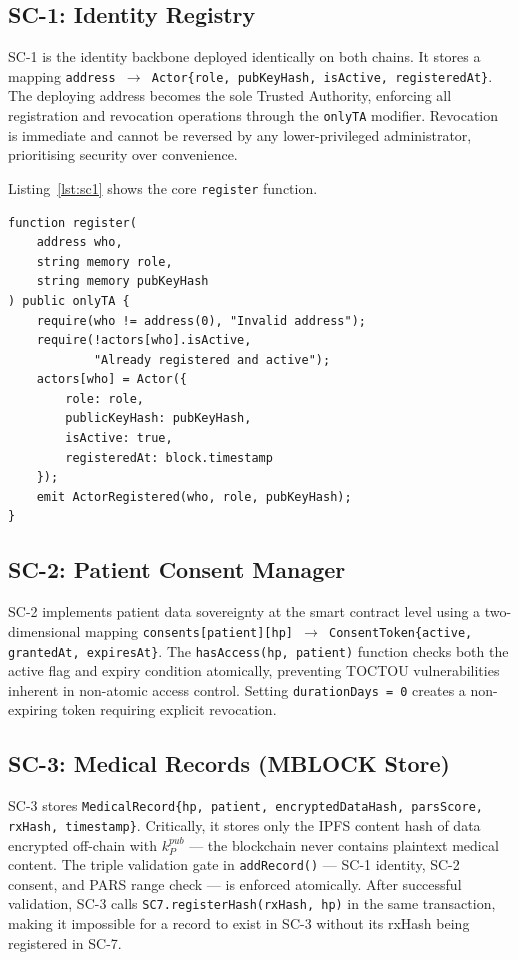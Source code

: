 \documentclass[sigplan,screen,review=false]{acmart}
\begin{document}
\subsection{SC-1: Identity Registry}

SC-1 is the identity backbone deployed identically on both chains. It
stores a mapping \texttt{address $\to$ Actor\{role, pubKeyHash, isActive, registeredAt\}}.
The deploying address becomes the sole Trusted Authority, enforcing
all registration and revocation operations through the \texttt{onlyTA}
modifier. Revocation is immediate and cannot be reversed by any lower-privileged
administrator, prioritising security over convenience.

Listing~\ref{lst:sc1} shows the core \texttt{register} function.

\begin{lstlisting}[caption={SC-1 actor registration (Solidity)},
                   label={lst:sc1}, language=Solidity]
function register(
    address who,
    string memory role,
    string memory pubKeyHash
) public onlyTA {
    require(who != address(0), "Invalid address");
    require(!actors[who].isActive,
            "Already registered and active");
    actors[who] = Actor({
        role: role,
        publicKeyHash: pubKeyHash,
        isActive: true,
        registeredAt: block.timestamp
    });
    emit ActorRegistered(who, role, pubKeyHash);
}
\end{lstlisting}

\subsection{SC-2: Patient Consent Manager}

SC-2 implements patient data sovereignty at the smart contract level
using a two-dimensional mapping
\texttt{consents[patient][hp] $\to$ ConsentToken\{active, grantedAt, expiresAt\}}.
The \texttt{hasAccess(hp, patient)} function checks both the active
flag and expiry condition atomically, preventing TOCTOU vulnerabilities
inherent in non-atomic access control. Setting \texttt{durationDays = 0}
creates a non-expiring token requiring explicit revocation.

\subsection{SC-3: Medical Records (MBLOCK Store)}

SC-3 stores \texttt{MedicalRecord\{hp, patient, encryptedDataHash, parsScore, rxHash, timestamp\}}.
Critically, it stores only the IPFS content hash of data encrypted
off-chain with $k^{pub}_P$ --- the blockchain never contains plaintext
medical content. The triple validation gate in \texttt{addRecord()} ---
SC-1 identity, SC-2 consent, and PARS range check --- is enforced
atomically. After successful validation, SC-3 calls
\texttt{SC7.registerHash(rxHash, hp)} in the same transaction,
making it impossible for a record to exist in SC-3 without its
rxHash being registered in SC-7.
\end{document}

